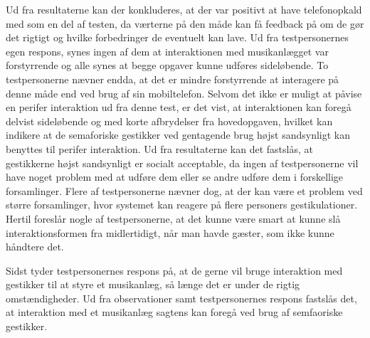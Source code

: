 Ud fra resultaterne kan der konkluderes, at der var positivt at have telefonopkald med som en del af testen, da værterne på den måde kan få feedback på om de gør det rigtigt og hvilke forbedringer de eventuelt kan lave.\blankline
%
Ud fra testpersonernes egen respons, synes ingen af dem at interaktionen med musikanlægget var forstyrrende og alle synes at begge opgaver kunne udføres sideløbende. To testpersonerne nævner endda, at det er mindre forstyrrende at interagere på denne måde end ved brug af sin mobiltelefon. Selvom det ikke er muligt at påvise en perifer interaktion ud fra denne test, er det vist, at interaktionen kan foregå delvist sideløbende og med korte afbrydelser fra hovedopgaven, hvilket kan indikere at de semaforiske gestikker ved gentagende brug højst sandsynligt kan benyttes til perifer interaktion.\blankline
%
Ud fra resultaterne kan det fastslås, at gestikkerne højst sandsynligt er socialt acceptable, da ingen af testpersonerne vil have noget problem med at udføre dem eller se andre udføre dem i forskellige forsamlinger. Flere af testpersonerne nævner dog, at der kan være et problem ved større forsamlinger, hvor systemet kan reagere på flere personers gestikulationer. Hertil foreslår nogle af testpersonerne, at det kunne være smart at kunne slå interaktionsformen fra midlertidigt, når man havde gæster, som ikke kunne håndtere det. 

Sidst tyder testpersonernes respons på, at de gerne vil bruge interaktion med gestikker til at styre et musikanlæg, så længe det er under de rigtig omstændigheder.\blankline
%
Ud fra observationer samt testpersonernes respons fastslås det, at interaktion med et musikanlæg sagtens kan foregå ved brug af semfaoriske gestikker.